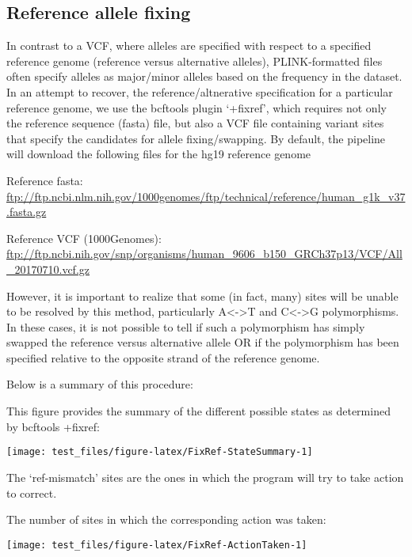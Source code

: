 \documentclass[]{article}
\begin{document}
\hypertarget{reference-allele-fixing}{%
\subsection{Reference allele fixing}\label{reference-allele-fixing}}

In contrast to a VCF, where alleles are specified with respect to a
specified reference genome (reference versus alternative alleles),
PLINK-formatted files often specify alleles as major/minor alleles based
on the frequency in the dataset. In an attempt to recover, the
reference/altnerative specification for a particular reference genome,
we use the bcftools plugin `+fixref', which requires not only the
reference sequence (fasta) file, but also a VCF file containing variant
sites that specify the candidates for allele fixing/swapping. By
default, the pipeline will download the following files for the hg19
reference genome

Reference fasta:
\url{ftp://ftp.ncbi.nlm.nih.gov/1000genomes/ftp/technical/reference/human_g1k_v37.fasta.gz}

Reference VCF (1000Genomes):
\url{ftp://ftp.ncbi.nih.gov/snp/organisms/human_9606_b150_GRCh37p13/VCF/All_20170710.vcf.gz}

However, it is important to realize that some (in fact, many) sites will
be unable to be resolved by this method, particularly
A\textless{}-\textgreater{}T and C\textless{}-\textgreater{}G
polymorphisms. In these cases, it is not possible to tell if such a
polymorphism has simply swapped the reference versus alternative allele
OR if the polymorphism has been specified relative to the opposite
strand of the reference genome.

Below is a summary of this procedure:

This figure provides the summary of the different possible states as
determined by bcftools +fixref:

\begin{center}\texttt{[image: test\_files/figure-latex/FixRef-StateSummary-1]} \end{center}

The `ref-mismatch' sites are the ones in which the program will try to
take action to correct.

The number of sites in which the corresponding action was taken:

\begin{center}\texttt{[image: test\_files/figure-latex/FixRef-ActionTaken-1]} \end{center}
\end{document}
